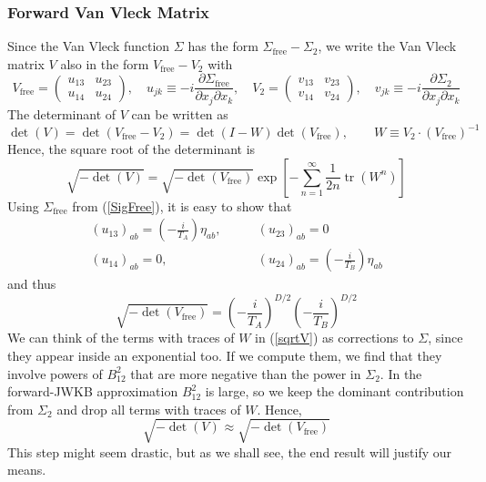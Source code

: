 \subsubsection{Forward Van Vleck Matrix}
Since the Van Vleck function $\Sigma$ has the form $\Sigma_{\text{free}} - \Sigma_{2}$, we write the Van Vleck matrix $V$ also in the form $V_{\text{free}} - V_{2}$ with
\begin{equation}
	V_{\text{free}} = \begin{pmatrix}
	u_{1 3} & u_{2 3} \\
	u_{1 4} & u_{2 4}
	\end{pmatrix}, \quad u_{jk} \equiv - i \frac{\partial \Sigma_{\text{free}}}{\partial x_{j} \partial x_{k}}, \quad V_{2} = \begin{pmatrix}
	v_{1 3} & v_{2 3} \\
	v_{1 4} & v_{2 4}
	\end{pmatrix}, \quad v_{jk} \equiv - i \frac{\partial \Sigma_{2}}{\partial x_{j} \partial x_{k}}
\end{equation}
The determinant of $V$ can be written as
\begin{equation}
	\det{(V)} = \det(V_{\text{free}} - V_{2}) = \det{(I - W)} \det{(V_{\text{free}})}, \qquad W \equiv V_{2} \cdot (V_{\text{free}})^{-1}
\end{equation}
Hence, the square root of the determinant is
\begin{equation}
	\sqrt{-\det{(V)}} = \sqrt{-\det{(V_{\text{free}})}} \exp{\left[ - \sum_{n = 1}^{\infty} \frac{1}{2 n} \operatorname{tr}{(W^{n})} \right]} \label{sqrtV}
\end{equation}
Using $\Sigma_{\text{free}}$ from (\ref{SigFree}), it is easy to show that
\begin{equation}
\begin{split}
	(u_{13})_{ab} = \left( - \frac{i}{T_{A}} \right) \eta_{ab}, &\qquad (u_{23})_{ab} = 0 \\
	(u_{14})_{ab} = 0, &\qquad (u_{24})_{ab} = \left( - \frac{i}{T_{B}} \right) \eta_{ab}
\end{split}
\end{equation}
and thus
\begin{equation}
	\sqrt{-\det{(V_{\text{free}})}} = \left( - \frac{i}{T_{A}} \right)^{D/2} \left( - \frac{i}{T_{B}} \right)^{D/2}
\end{equation}
We can think of the terms with traces of $W$ in (\ref{sqrtV}) as corrections to $\Sigma$, since they appear inside an exponential too. If we compute them, we find that they involve powers of $B_{12}^{2}$ that are more negative than the power in $\Sigma_{2}$. In the forward-JWKB approximation $B_{1 2}^{2}$ is large, so we keep the dominant contribution from $\Sigma_{2}$ and drop all terms with traces of $W$. Hence,
\begin{equation}
	\sqrt{-\det{(V)}} \approx \sqrt{-\det{(V_{\text{free}})}}
\end{equation}
This step might seem drastic, but as we shall see, the end result will justify our means.
